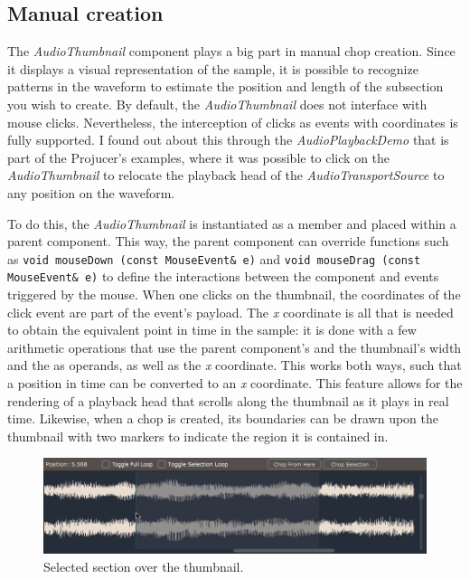 \documentclass[12pt, a4paper, hidelinks]{report}
\begin{document}
	\subsection{Manual creation}
	The \textit{AudioThumbnail} component plays a big part in manual chop creation. Since it displays a visual representation of the sample, it is possible to recognize patterns in the waveform to estimate the position and length of the subsection you wish to create. By default, the \textit{AudioThumbnail} does not interface with mouse clicks. Nevertheless, the interception of clicks as events with coordinates is fully supported. I found out about this through the \textit{AudioPlaybackDemo} that is part of the Projucer's examples, where it was possible to click on the \textit{AudioThumbnail} to relocate the playback head of the \textit{AudioTransportSource} to any position on the waveform.\par
	To do this, the \textit{AudioThumbnail} is instantiated as a member and placed within a parent component. This way, the parent component can override functions such as \texttt{void mouseDown (const MouseEvent\& e)} and \texttt{void mouseDrag (const MouseEvent\& e)} to define the interactions between the component and events triggered by the mouse. When one clicks on the thumbnail, the coordinates of the click event are part of the event's payload. The \textit{x} coordinate is all that is needed to obtain the equivalent point in time in the sample: it is done with a few arithmetic operations that use the parent component's and the thumbnail's width and the as operands, as well as the \textit{x} coordinate. This works both ways, such that a position in time can be converted to an \textit{x} coordinate. This feature allows for the rendering of a playback head that scrolls along the thumbnail as it plays in real time. Likewise, when a chop is created, its boundaries can be drawn upon the thumbnail with two markers to indicate the region it is contained in.\par
	\begin{figure}[h!]
		\centering
		\includegraphics[width=\textwidth]{u/select.png}
		\caption{Selected section over the thumbnail.}
		\label{fig:select}
	\end{figure}
\end{document}
